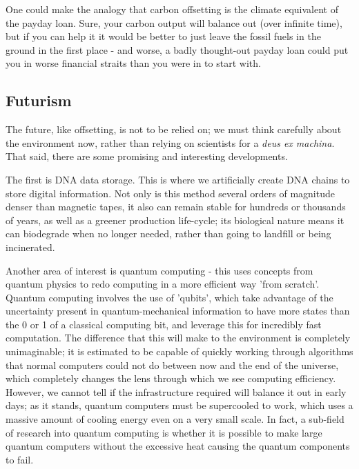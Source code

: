 \documentclass{article}
\begin{document}
One could make the analogy that carbon offsetting is the climate equivalent of the payday loan. Sure, your carbon output will balance out (over infinite time), but if you can help it it would be better to just leave the fossil fuels in the ground in the first place - and worse, a badly thought-out payday loan could put you in worse financial straits than you were in to start with.


\subsection{Futurism}
The future, like offsetting, is not to be relied on; we must think carefully about the environment now, rather than relying on scientists for a \emph{deus ex machina}. That said, there are some promising and interesting developments.\newline

The first is DNA data storage. This is where we artificially create DNA chains to store digital information. Not only is this method several orders of magnitude denser than magnetic tapes, it also can remain stable for hundreds or thousands of years, as well as a greener production life-cycle; its biological nature means it can biodegrade when no longer needed, rather than going to landfill or being incinerated. \citep{nguyen2020architecting}\newline

Another area of interest is quantum computing - this uses concepts from quantum physics to redo computing in a more efficient way 'from scratch'. Quantum computing involves the use of 'qubits', which take advantage of the uncertainty present in quantum-mechanical information to have more states than the 0 or 1 of a classical computing bit, and leverage this for incredibly fast computation. \citep{national2019quantum} The difference that this will make to the environment is completely unimaginable; it is estimated to be capable of quickly working through algorithms that normal computers could not do between now and the end of the universe, which completely changes the lens through which we see computing efficiency. \citep{gyongyosi2019survey} However, we cannot tell if the infrastructure required will balance it out in early days; as it stands, quantum computers must be supercooled to work, which uses a massive amount of cooling energy even on a very small scale. In fact, a sub-field of research into quantum computing is whether it is possible to make large quantum computers without the excessive heat causing the quantum components to fail. \citep{ikonen2017energy}\newline
\end{document}
